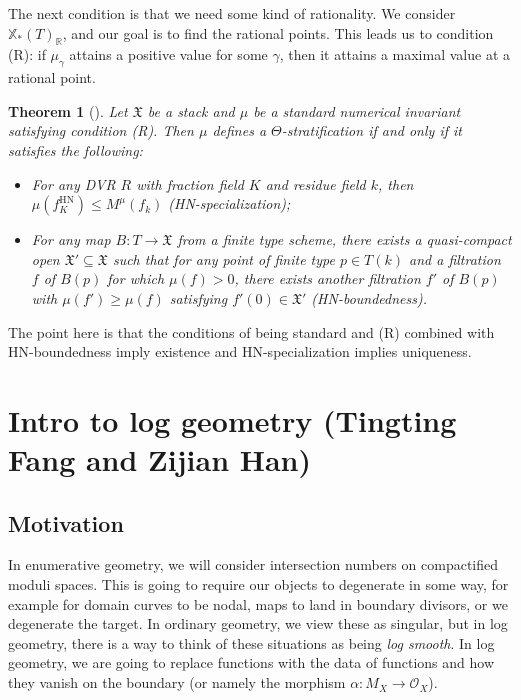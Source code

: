 \documentclass{amsart}
\newtheorem{thm}{Theorem}[section]
\theoremstyle{definition}
\theoremstyle{remark}
\theoremstyle{plain}
\theoremstyle{definition}
\theoremstyle{remark}
\newcommand{\R}{\mathbb{R}}
\newcommand{\mc}[1]{\mathcal{#1}}
\newcommand{\mf}[1]{\mathfrak{#1}}
\newcommand{\mr}[1]{\mathrm{#1}}
\newcommand{\1}{\mathbf{1}}
\newcommand{\2}{\mathbf{2}}
\newcommand{\3}{\mathbf{3}}
\begin{document}
The next condition is that we need some kind of rationality. We consider \(\mathbb{X}_*(T)_{\R}\), and our goal is to find the rational points. This leads us to condition (R): if \(\mu_{\gamma}\) attains a positive value for some \(\gamma\), then it attains a maximal value at a rational point.

\begin{thm}[{\cite{HLinstability}}]
    Let \(\mf{X}\) be a stack and \(\mu\) be a standard numerical invariant satisfying condition (R). Then \(\mu\) defines a \(\Theta\)-stratification if and only if it satisfies the following:
    \begin{itemize}
        \item For any DVR \(R\) with fraction field \(K\) and residue field \(k\), then \(\mu(f_K^{\mr{HN}}) \leq M^{\mu}(f_k)\) (HN-specialization);
        \item For any map \(B \colon T \to \mf{X}\) from a finite type scheme, there exists a quasi-compact open \(\mf{X}' \subseteq \mf{X}\) such that for any point of finite type \(p \in T(k)\) and a filtration \(f\) of \(B(p)\) for which \(\mu(f) > 0\), there exists another filtration \(f'\) of \(B(p)\) with \(\mu(f') \geq \mu(f)\) satisfying \(f'(0) \in \mf{X}'\) (HN-boundedness).
    \end{itemize}
\end{thm}

The point here is that the conditions of being standard and (R) combined with HN-boundedness imply existence and HN-specialization implies uniqueness.



\section{Intro to log geometry (Tingting Fang and Zijian Han)}%
\label{sec:Intro to log geometry (Tingting Fang and Zijian Han)}

\subsection{Motivation}%
\label{sub:Motivation}

In enumerative geometry, we will consider intersection numbers on compactified moduli spaces. This is going to require our objects to degenerate in some way, for example for domain curves to be nodal, maps to land in boundary divisors, or we degenerate the target. In ordinary geometry, we view these as singular, but in log geometry, there is a way to think of these situations as being \textit{log smooth}. In log geometry, we are going to replace functions with the data of functions and how they vanish on the boundary (or namely the morphism \(\alpha \colon M_X \to \mc{O}_X\)).
\end{document}
